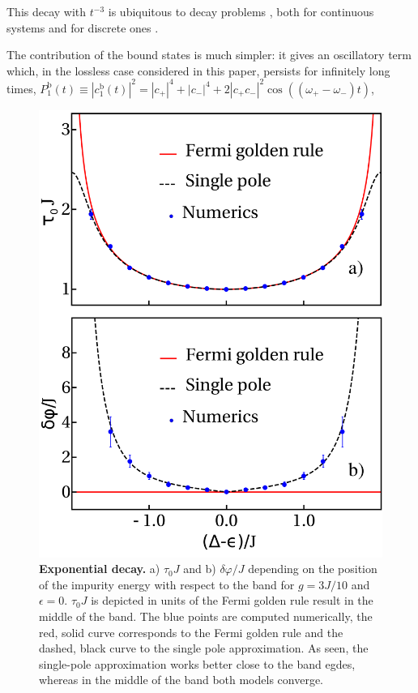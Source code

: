 \documentclass[aps,pra,twocolumn,floatfix,superscriptaddress]{revtex4-1}%
\begin{document}
This decay with $t^{-3}$ is ubiquitous to decay problems \cite{Chiu1977}, both for continuous systems \cite{Winter1961,GarciaCalderon2006} and for discrete ones \cite{Longhi2006a,Dente2008,Longhi2006b}.


The contribution of the bound states is much simpler: it gives an oscillatory term which, in the lossless case considered in this paper, persists for infinitely long times, $P_1^\text{b}(t)\equiv|c_1^\text{b}(t)|^2=|c_+|^4+|c_-|^4+2|c_+c_-|^2\cos((\omega_+-\omega_-)t)$, \cite{Gaveau1995,Lombardo2014}

\begin{figure}[thb!]
\includegraphics[width=1.0\columnwidth]{gamma_phi_g_0_3.pdf}
\caption{{\bf Exponential decay.} a) $\tau_0 J$ and b) $\delta\varphi/J$ depending on the position of the impurity energy with respect to the band for $g=3J/10$ and $\epsilon=0$. $\tau_0 J$ is depicted in units of the Fermi golden rule result in the middle of the band. The blue points are computed numerically, the red, solid curve corresponds to the Fermi golden rule and the dashed, black curve to the single pole approximation. As seen, the single-pole approximation works better close to the band egdes, whereas in the middle of the band both models converge.}\label{fig:qubit_decay}
\end{figure}
\end{document}
